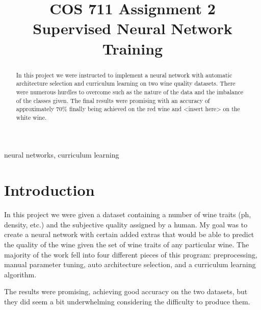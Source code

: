 \documentclass[conference]{IEEEtran}
\begin{document}
\title{COS 711 Assignment 2\\
{\footnotesize Supervised Neural Network Training}
}

\author{
}

\maketitle

\begin{abstract}
In this project we were instructed to implement a neural network with
automatic architecture selection and curriculum learning on two wine quality
datasets. There were numerous hurdles to overcome such as the nature of the data
and the imbalance of the classes given. The final results were promising with 
an accuracy of approximately 70\% finally being achieved on the red wine and
<insert here> on the white wine.
\end{abstract}

\begin{IEEEkeywords}
neural networks, curriculum learning
\end{IEEEkeywords}

\section{Introduction}
In this project we were given a dataset containing a number of wine traits
(ph, density, etc.) and the subjective quality assigned by a human. My goal was
to create a neural network with certain added extras that would be able to predict
the quality of the wine given the set of wine traits of any particular wine. The
majority of the work fell into four different pieces of this program: preprocessing,
manual parameter tuning, auto architecture selection, and a curriculum learning algorithm.

The results were promising, achieving good accuracy on the two datasets, but
they did seem a bit underwhelming considering the difficulty to produce them.
\end{document}
